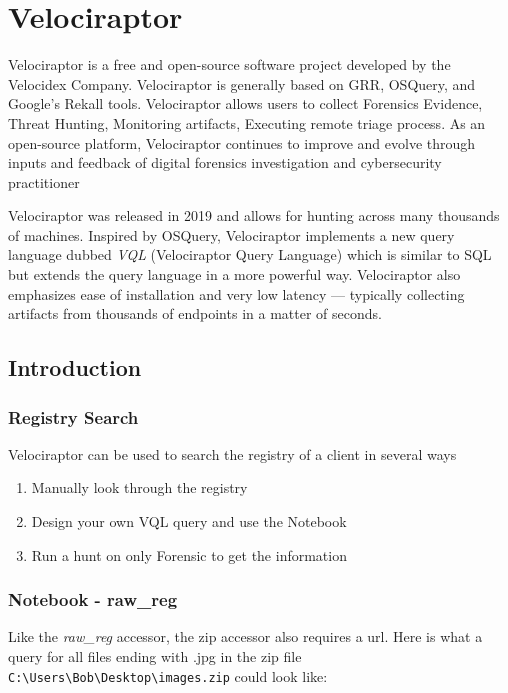

\section{Velociraptor}
Velociraptor is a free and open-source software project developed by the Velocidex Company. Velociraptor is generally based on GRR, OSQuery, and Google's Rekall tools. Velociraptor allows users to collect Forensics Evidence, Threat Hunting, Monitoring artifacts, Executing remote triage process. As an open-source platform, Velociraptor continues to improve and evolve through inputs and feedback of digital forensics investigation and cybersecurity practitioner

Velociraptor was released in 2019 and allows for hunting across many thousands of machines. Inspired by OSQuery, Velociraptor implements a new query language dubbed \textit{VQL} (Velociraptor Query Language) which is similar to SQL but extends the query language in a more powerful way. Velociraptor also emphasizes ease of installation and very low latency — typically collecting artifacts from thousands of endpoints in a matter of seconds.

\subsection{Introduction}

\subsubsection{Registry Search}
Velociraptor can be used to search the registry of a client in several ways
\begin{enumerate}
    \item Manually look through the registry
    \item Design your own VQL query and use the Notebook
    \item Run a hunt on only Forensic to get the information
\end{enumerate}

\subsubsection{Notebook - raw\_reg}
Like the \textit{raw\_reg} accessor, the zip accessor also requires a url. Here is what a query for all files ending with .jpg in the zip file \lstinline|C:\Users\Bob\Desktop\images.zip| could look like:

